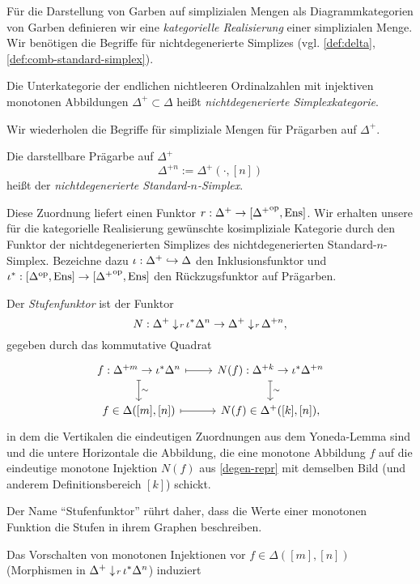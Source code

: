 Für die Darstellung von Garben auf simplizialen Mengen als
Diagrammkategorien von Garben definieren wir eine \emph{kategorielle
  Realisierung} einer simplizialen Menge. Wir benötigen die Begriffe
für nichtdegenerierte Simplizes (vgl. \ref{def:delta},
\ref{def:comb-standard-simplex}).
\begin{defn}
  Die Unterkategorie der endlichen nichtleeren Ordinalzahlen mit
  injektiven monotonen Abbildungen $\Delta^+ \subset \Delta$ heißt
  \emph{nichtdegenerierte Simplexkategorie}.
\end{defn}
Wir wiederholen die Begriffe für simpliziale Mengen für Prägarben auf
$\Delta^+$.
\begin{defn}
  Die darstellbare Prägarbe auf $\Delta^+$
  \[ \Delta^{+n} :=  \Delta^+(\cdot, [n]) \]
  heißt der \emph{nichtdegenerierte Standard-$n$-Simplex}.
\end{defn}
Diese Zuordnung liefert einen Funktor $r: \Delta^+ \to [{\Delta^+}^\mathrm{op},
  \operatorname{Ens}]$. Wir erhalten unsere für die kategorielle Realisierung
gewünschte kosimpliziale Kategorie durch den Funktor der
nichtdegenerierten Simplizes des nichtdegenerierten
Standard-$n$-Simplex. Bezeichne dazu $\iota: \Delta^+ \hookrightarrow \Delta$ den
Inklusionsfunktor und $\iota^*: [\Delta^\mathrm{op}, \operatorname{Ens}] \to [{\Delta^+}^\mathrm{op},
  \operatorname{Ens}]$ den Rückzugsfunktor auf Prägarben.
\begin{defn}
  Der \emph{Stufenfunktor} ist der Funktor
  \[N: \Delta^+ \downarrow \! {\scriptstyle r} \, \iota^* \Delta^n
  \to \Delta^+ \downarrow \! {\scriptstyle r} \, \Delta^{+n},
  \]
  gegeben durch das kommutative Quadrat
  \[ 
  \begin{tikzcd}
    f: \Delta^{+m} \to \iota^* \Delta^n \dar[mapsto]{\sim} \rar[mapsto]
    & N(f):  \Delta^{+k}  \to \iota^* \Delta^{+n} \dar[mapsto]{\sim} \\
    f \in \Delta([m], [n]) \rar[mapsto]
    & N(f) \in \Delta^+([k], [n]),
  \end{tikzcd}
  \]
  in dem die Vertikalen die eindeutigen Zuordnungen aus dem
  Yoneda-Lemma sind und die untere Horizontale die Abbildung, die eine
  monotone Abbildung $f$ auf die eindeutige monotone Injektion $N(f)$
  aus \ref{degen-repr} mit demselben Bild (und anderem
  Definitionsbereich $[k]$) schickt.
\end{defn}
\begin{bem}
  Der Name ``Stufenfunktor'' rührt daher, dass die Werte einer
  monotonen Funktion die Stufen in ihrem Graphen beschreiben.
\end{bem}
Das Vorschalten von monotonen Injektionen vor $f \in \Delta([m], [n])$
(Morphismen in $\Delta^+ \downarrow \! {\scriptstyle r} \, \iota^* \Delta^n$) induziert
